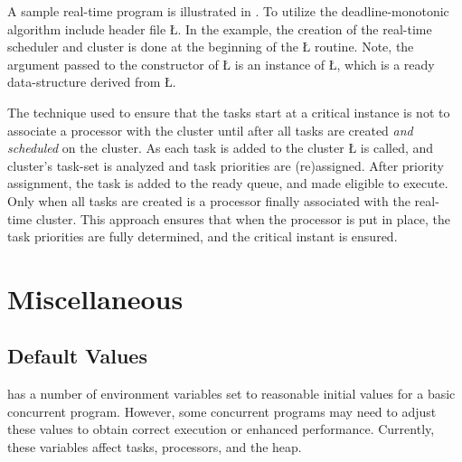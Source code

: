 \documentclass[openright,twoside]{report}
\begin{document}
A sample real-time program is illustrated in .  
To utilize the deadline-monotonic algorithm include header file \LGinlinetrue\LGbegin\lgrinde\L{}\endlgrinde\LGend{}.
In the example, the creation of the real-time scheduler and cluster is done at the beginning of the \LGinlinetrue\LGbegin\lgrinde\L{}\endlgrinde\LGend{} routine.
Note, the argument passed to the constructor of \LGinlinetrue\LGbegin\lgrinde\L{}\endlgrinde\LGend{} is an instance of \LGinlinetrue\LGbegin\lgrinde\L{}\endlgrinde\LGend{}, which is a ready data-structure derived from \LGinlinetrue\LGbegin\lgrinde\L{}\endlgrinde\LGend{}.

The technique used to ensure that the tasks start at a critical instance is not to associate a processor with the cluster until after all tasks are created \emph{and scheduled} on the cluster.
As each task is added to the cluster \LGinlinetrue\LGbegin\lgrinde\L{}\endlgrinde\LGend{} is called, and cluster's task-set is analyzed and task priorities are (re)assigned.
After priority assignment, the task is added to the ready queue, and made eligible to execute.
Only when all tasks are created is a processor finally associated with the real-time cluster.
This approach ensures that when the processor is put in place, the task priorities are fully determined, and the critical instant is ensured.


\chapter{Miscellaneous}
\label{c:Miscellaneous}


\section{Default Values}
\label{s:DefaultValues}

\uC has a number of environment variables set to reasonable initial values for a basic concurrent program.
However, some concurrent programs may need to adjust these values to obtain correct execution or enhanced performance.
Currently, these variables affect tasks, processors, and the heap.
\end{document}
